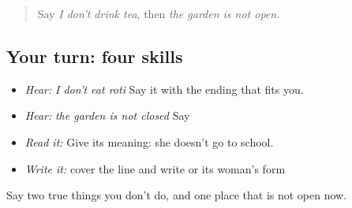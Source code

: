 \label{lesson:PA-C212-payoff}



\begin{quote}
Say \emph{I don't drink tea}, then \emph{the garden is not open}.
\end{quote}

\subsection*{Your turn: four skills}
\begin{itemize}
\raggedright
  \item \emph{Hear:} \emph{I don't eat roti} Say it with the ending that fits you.
  \item \emph{Hear:} \emph{the garden is not closed} Say \textbf{   }
  \item \emph{Read it:} \textbf{    } Give its meaning: she doesn't go to school.
  \item \emph{Write it:} cover the line and write \textbf{    } or its woman's form
\end{itemize}

\begin{tcolorbox}[breakable,colback=teal!4,colframe=teal!35!black,title={Before you move on}]
Say two true things you don't do, and one place that is not open now.
\end{tcolorbox}
